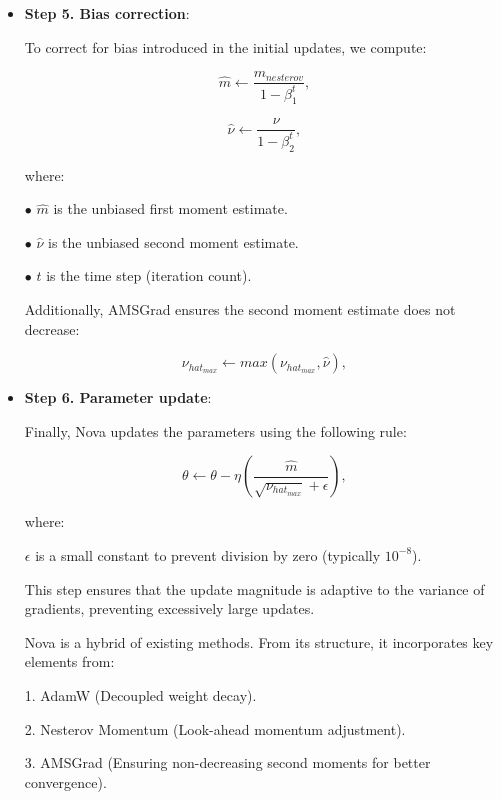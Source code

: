 \documentclass{article}
\begin{document}
\begin{itemize}
Nova follows the AMSGrad strategy, ensuring that the second moment estimate is non-decreasing:

\begin{equation}
\nu \leftarrow \beta_2\nu+(1-\beta_2)g^2, 
\end{equation}

where:


$\bullet$ $\nu$ is the second moment estimate (uncentered variance of gradients).

$\bullet$ $\beta_2$ is the decay rate for $\nu$ (typically 0.999).


\item {\bf Step 5. Bias correction}:


To correct for bias introduced in the initial updates, we compute:


\begin{equation}
\hat{m} \leftarrow \dfrac{m_{nesterov}}{1-\beta_1^t},
\end{equation}


\begin{equation}
\hat{\nu} \leftarrow \dfrac{\nu}{1-\beta_2^t},
\end{equation}

where:


$\bullet$   $\hat{m}$ is the unbiased first moment estimate.

$\bullet$ $\hat{\nu}$ is the unbiased second moment estimate.

$\bullet$ $t$ is the time step (iteration count).


Additionally, AMSGrad ensures the second moment estimate does not decrease:


\begin{equation}
\nu_{hat_{max}} \leftarrow max(\nu_{hat_{max}}, \hat{\nu}),
\end{equation}




\item {\bf Step 6. Parameter update}:

Finally, Nova updates the parameters using the following rule:

\begin{equation}
\theta \leftarrow   \theta - \eta(\dfrac{\hat{m}}{\sqrt{\nu_{hat_{max}}}+\epsilon}),
\end{equation}


where:

$\epsilon$ is a small constant to prevent division by zero (typically $10^{-8}$).


This step ensures that the update magnitude is adaptive to the variance of gradients, preventing excessively large updates.


Nova is  a hybrid of existing methods. From its structure, it incorporates key elements from:

1. AdamW (Decoupled weight decay).


2. Nesterov Momentum (Look-ahead momentum adjustment).


3. AMSGrad (Ensuring non-decreasing second moments for better convergence).

\end{itemize}
\end{document}

